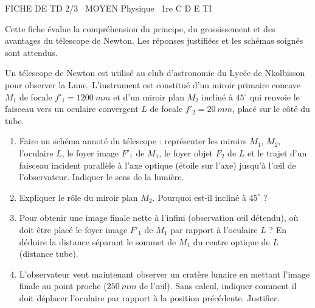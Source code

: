 \documentclass[11pt]{article}
\begin{document}
\begin{tcolorbox}[enhanced,colback=popink,colframe=popink,arc=10pt,boxrule=0pt,left=12pt,right=12pt,top=9pt,bottom=9pt]
{\color{white}\popxbold\small FICHE DE TD 2/3 \textbullet\ MOYEN \hfill Physique \textbullet\ 1re C D E TI\par}
\end{tcolorbox}
\vspace{4pt}
\noindent Cette fiche évalue la compréhension du principe, du grossissement et des avantages du télescope de Newton. Les réponses justifiées et les schémas soignés sont attendus.

\begin{exercice}
Un télescope de Newton est utilisé au club d'astronomie du Lycée de Nkolbisson pour observer la Lune. L'instrument est constitué d'un miroir primaire concave $M_1$ de focale $f'_1 = \SI{1200}{mm}$ et d'un miroir plan $M_2$ incliné à $45^\circ$ qui renvoie le faisceau vers un oculaire convergent $L$ de focale $f'_2 = \SI{20}{mm}$, placé sur le côté du tube.
\begin{enumerate}
    \item Faire un schéma annoté du télescope : représenter les miroirs $M_1$, $M_2$, l'oculaire $L$, le foyer image $F'_1$ de $M_1$, le foyer objet $F_2$ de $L$ et le trajet d'un faisceau incident parallèle à l'axe optique (étoile sur l'axe) jusqu'à l'œil de l'observateur. Indiquer le sens de la lumière.
    \item Expliquer le rôle du miroir plan $M_2$. Pourquoi est-il incliné à $45^\circ$ ?
    \item Pour obtenir une image finale nette à l'infini (observation œil détendu), où doit être placé le foyer image $F'_1$ de $M_1$ par rapport à l'oculaire $L$ ? En déduire la distance séparant le sommet de $M_1$ du centre optique de $L$ (distance tube).
    \item L'observateur veut maintenant observer un cratère lunaire en mettant l'image finale au point proche ($\SI{250}{mm}$ de l'œil). Sans calcul, indiquer comment il doit déplacer l'oculaire par rapport à la position précédente. Justifier.
\end{enumerate}
\end{exercice}
\end{document}

